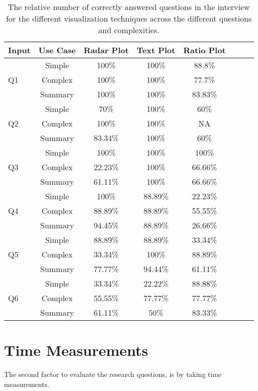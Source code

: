 \begin{table}[!htbp]
\centering
\small
\begin{tabular}{lccccccc}
\toprule   
 Input & Use Case & Radar Plot  & Text Plot  & Ratio Plot \\ 
\midrule
& Simple & 100\% &  100\% & 88.8\%\\ 
Q1  & Complex &  100\% &  100\% &  77.7\%\\ 
\midrule
& Summary &  100\% &  100\% &  83.83\%\\
\bottomrule
& Simple & 70\% &  100\% & 60\%\\ 
Q2 & Complex & 100\% & 100\% & NA\\ 
\midrule
& Summary & 83.34\% & 100\% &  60\%\\
\bottomrule
& Simple & 100\% &  100\% & 100\%\\ 
Q3 & Complex & 22.23\% & 100\% & 66.66\%\\ 
\midrule
& Summary & 61.11\% & 100\% &  66.66\%\\
\bottomrule
& Simple & 100\% &  88.89\% & 22.23\%\\ 
Q4 & Complex & 88.89\% & 88.89\% & 55.55\%\\ 
\midrule
& Summary & 94.45\% & 88.89\% &  26.66\%\\
\bottomrule
& Simple &  88.89\% &  88.89\% & 33.34\%\\ 
Q5 & Complex & 33.34\% & 100\% &  88.89\%\\ 
\midrule
& Summary & 77.77\% & 94.44\% &  61.11\%\\
\bottomrule
& Simple &  33.34\% &  22.22\% & 88.88\%\\ 
Q6 & Complex & 55.55\% & 77.77\% &  77.77\%\\ 
\midrule
& Summary & 61.11\% & 50\% & 83.33\%\\
\bottomrule
\end{tabular}
\label{table:correctness}
\caption[Correctness Table]{The relative number of correctly answered questions in the interview for the different visualization techniques
across the different questions and complexities.} 
\end{table}
 
\section{Time Measurements}
\label{sec:4.2}
The second factor to evaluate the research questions, is by taking time measurements.

